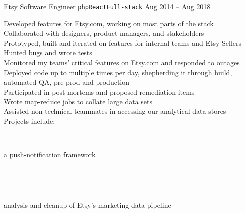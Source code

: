 \documentclass[9pt]{developercv} %
\begin{document}



\begin{entrylist}
    \entry
        {Etsy}
        {Software Engineer \hspace{1mm}\texttt{php}\slashsep\texttt{React}\slashsep\texttt{Full-stack}}
        {Aug 2014 -- Aug 2018}
        {
            Developed features for Etsy.com, working on most parts of the stack\\
            Collaborated with designers, product managers, and stakeholders\\
            Prototyped, built and iterated on features for internal teams and Etsy Sellers\\
            Hunted bugs and wrote tests\\
            Monitored my teams’ critical features on Etsy.com and responded to outages\\
            Deployed code up to multiple times per day, shepherding it through build, automated QA, pre-prod and production\\
            Participated in post-mortems and proposed remediation items\\
            Wrote map-reduce jobs to collate large data sets\\
            Assisted non-technical teammates in accessing our analytical data stores\\
            Projects include:\\
            \begin{minipage}[t]{0.05\textwidth}\,\end{minipage}
            \begin{minipage}[t]{0.8\textwidth}a push-notification framework\end{minipage}\\
            \begin{minipage}[t]{0.05\textwidth}\,\end{minipage}
            \begin{minipage}[t]{0.8\textwidth}analysis and cleanup of Etsy’s marketing data pipeline\end{minipage}\\
}
\end{entrylist}
\end{document}
